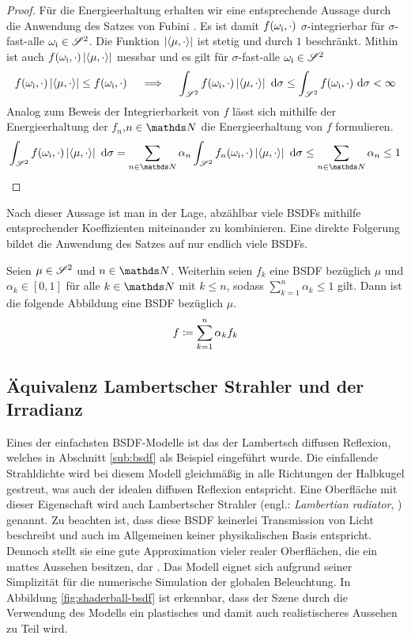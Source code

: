 \begin{proof}
			Für die Energieerhaltung erhalten wir eine entsprechende Aussage durch die Anwendung des Satzes von Fubini \cite[S.~175~f]{measure-theory}.
			Es ist damit $f(\omega_{\mathrm{i}},\cdot)$ $\sigma$-integrierbar für $\sigma$-fast-alle $\omega_{\mathrm{i}}\in\mathscr{S}^{2}$.
			Die Funktion $\left\vert \left\langle \mu,\cdot \right\rangle \right\vert$ ist stetig und durch $1$ beschränkt.
			Mithin ist auch $f(\omega_{\mathrm{i}},\cdot)\left\vert \left\langle \mu,\cdot \right\rangle \right\vert$ messbar und es gilt für $\sigma$-fast-alle $\omega_{\mathrm{i}}\in\mathscr{S}^{2}$
			\[
				f(\omega_{\mathrm{i}},\cdot)\left\vert \left\langle \mu,\cdot \right\rangle \right\vert \leq f(\omega_{\mathrm{i}},\cdot) \quad \implies \quad \int_{\mathscr{S}^{2}}^{} f(\omega_{\mathrm{i}},\cdot)\left\vert \left\langle \mu,\cdot \right\rangle \right\vert\ \mathrm{d} \sigma \leq \int_{\mathscr{S}^{2}}^{} f(\omega_{\mathrm{i}},\cdot)\ \mathrm{d} \sigma < \infty
			\]
			Analog zum Beweis der Integrierbarkeit von $f$ lässt sich mithilfe der Energieerhaltung der $f_n$,$n\in\SN$ die Energieerhaltung von $f$ formulieren.
			\[
				\integral{\ssp}{}{f(\omega_\m{i},\cdot)\abs{\dotp{\mu}{\cdot}}}{\sigma} = \sum_{n\in\SN}\alpha_n \integral{\ssp}{}{f_n(\omega_\m{i},\cdot)\abs{\dotp{\mu}{\cdot}}}{\sigma} \leq \sum_{n\in\SN}\alpha_n \leq 1
			\]
		\end{proof}

		Nach dieser Aussage ist man in der Lage, abzählbar viele BSDFs mithilfe entsprechender Koeffizienten miteinander zu kombinieren.
		Eine direkte Folgerung bildet die Anwendung des Satzes auf nur endlich viele BSDFs.
		\begin{corollary*}
			Seien $\mu\in\mathscr{S}^{2}$ und $n\in\SN$.
			Weiterhin seien $f_k$ eine BSDF bezüglich $\mu$ und $\alpha_k\in[0,1]$ für alle $k\in\SN$ mit $k\leq n$, sodass $\sum_{k=1}^n \alpha_k \leq 1$ gilt.
			Dann ist die folgende Abbildung eine BSDF bezüglich $\mu$.
			\[
				f\coloneqq \sum_{k=1}^n\alpha_k f_k
			\]
		\end{corollary*}


	\subsection{Äquivalenz Lambertscher Strahler und der Irradianz} %
	\label{sub:aquivalenz_lambertscher_strahler_und_der_irradianz}

		Eines der einfachsten BSDF-Modelle ist das der Lambertsch diffusen Reflexion, welches in Abschnitt \ref{sub:bsdf} als Beispiel eingeführt wurde.
		Die einfallende Strahldichte wird bei diesem Modell gleichmäßig in alle Richtungen der Halbkugel gestreut, was auch der idealen diffusen Reflexion entspricht.
		Eine Oberfläche mit dieser Eigenschaft wird auch Lambertscher Strahler (engl.: \textit{Lambertian radiator}, \cite[S.~17]{intro-radiometry}) genannt.
		Zu beachten ist, dass diese BSDF keinerlei Transmission von Licht beschreibt und auch im Allgemeinen keiner physikalischen Basis entspricht.
		Dennoch stellt sie eine gute Approximation vieler realer Oberflächen, die ein mattes Aussehen besitzen, dar \cite[S.~532]{pbrt3}.
		Das Modell eignet sich aufgrund seiner Simplizität für die numerische Simulation der globalen Beleuchtung.
		In Abbildung \ref{fig:shaderball-bsdf} ist erkennbar, dass der Szene durch die Verwendung des Modells ein plastisches und damit auch realistischeres Aussehen zu Teil wird.


